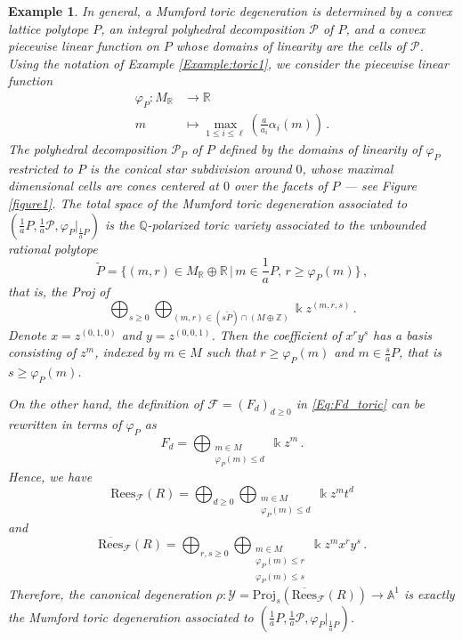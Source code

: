 \documentclass[12pt,letterpaper, reqno]{amsart}
\theoremstyle{defstyle} \newtheorem{definition}[theorem]{Definition}
\newtheorem{example}[theorem]{Example}
\theoremstyle{remark}
\numberwithin{equation}{section}
\numberwithin{figure}{section}
\newcommand{\cF} {\mathcal{F}}
\newcommand{\Proj} {\mathrm{Proj}}
\newcommand{\kk} {\Bbbk}
\newcommand{\A} {\mathbb{A}}
\newcommand{\QQ} {\mathbb{Q}}
\newcommand{\RR} {\mathbb{R}}
\newcommand{\ZZ} {\mathbb{Z}}
\newcommand{\sP} {\mathscr{P}}
\newcommand{\cY} {\mathcal{Y}}
\begin{document}
\begin{example}
In general, a Mumford toric degeneration is determined by a convex lattice polytope $P$, an integral polyhedral decomposition $\sP$ of $P$, and a convex piecewise linear function on $P$ whose domains of linearity are the cells of $\sP$. 
Using the notation of Example \ref{Example:toric1}, we consider the piecewise linear function 
\begin{align*}
    \varphi_P: M_\RR &\longrightarrow \RR \\
    m &\longmapsto \max_{1 \leq i \leq \ell} \left( \frac{a}{a_i} \alpha_i(m) \right)\,.
\end{align*}
The polyhedral decomposition $\sP_P$ of $P$ defined by the domains of linearity of $\varphi_P$ restricted to $P$ is the conical star subdivision around $0$, whose maximal dimensional cells are cones centered at $0$ over the facets of $P$ --- see Figure \ref{figure1}. 
The total space of the Mumford toric degeneration associated to $(\frac{1}{a}P, \frac{1}{a}\sP, \varphi_P|_{\frac{1}{a}P})$ is the $\QQ$-polarized toric variety associated to the unbounded rational polytope
    \[ \widetilde{P}=\{ (m,r) \in M_\RR \oplus \RR\,|\, m \in \frac{1}{a}P, \, r \geq \varphi_P(m)\} \,,\]
    that is, 
    the Proj of 
    \[ \bigoplus_{s \geq 0} \bigoplus_{(m,r) \in (s\widetilde{P}) \cap (M \oplus \ZZ) } \kk z^{(m,r,s)} \,. \]
Denote $x=z^{(0,1,0)}$ and $y=z^{(0,0,1)}$. Then the coefficient of $x^r y^s$ has a basis consisting of $z^m$, indexed by
$m \in M$ such that $r \geq \varphi_P(m)$ and $m \in \frac{s}{a}P$, that is $s \geq \varphi_P(m)$.

On the other hand, the definition of $\cF=(F_d)_{d\geq 0}$ in \eqref{Eq:Fd_toric} can be rewritten in terms of $\varphi_P$ as 
    \[F_d = \bigoplus_{\substack{m \in M \\ \varphi_P(m) \leq d }} \kk z^m \,.\]
    Hence, we have 
    \[ \mathrm{Rees}_\cF(R) = \bigoplus_{d \geq 0} \bigoplus_{\substack{m \in M \\ \varphi_P(m) \leq d }} \kk z^m  t^d\]
and 
\[ \overline{\mathrm{Rees}}_\cF(R) = \bigoplus_{r,s \geq 0} \bigoplus_{\substack{m \in M \\ \varphi_P(m) \leq r \\ \varphi_P(m)\leq s}} \kk z^m x^r y^s \,.\]
Therefore, the canonical degeneration $\rho: \cY = \Proj_s( \overline{\mathrm{Rees}}_\cF(R)) \rightarrow \A^1$ is exactly the  
Mumford toric degeneration associated to $(\frac{1}{a}P, \frac{1}{a}\sP, \varphi_P|_{\frac{1}{a}P})$.
\end{example}
\end{document}
